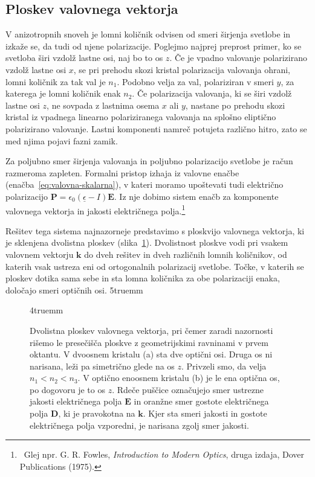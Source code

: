 \subsection*{Ploskev valovnega vektorja}
V anizotropnih snoveh je lomni količnik odvisen od smeri 
širjenja svetlobe in izkaže se, da tudi od njene polarizacije. Poglejmo 
najprej preprost primer, ko se svetloba širi vzdolž lastne osi, naj bo to os $z$.
Če je vpadno valovanje polarizirano vzdolž lastne osi $x$, se pri prehodu
skozi kristal polarizacija valovanja ohrani, lomni količnik za
tak val je $n_{1}$. Podobno velja za val, polariziran v smeri
$y$, za katerega je lomni količnik enak $n_{2}$. Če polarizacija valovanja, 
ki se širi vzdolž lastne osi $z$, ne sovpada z lastnima osema $x$ ali $y$, nastane po 
prehodu skozi kristal iz vpadnega linearno polariziranega valovanja na splošno eliptično polarizirano valovanje. Lastni komponenti namreč potujeta različno
hitro, zato se med njima pojavi fazni zamik. 

Za poljubno smer širjenja valovanja in poljubno polarizacijo svetlobe je račun razmeroma zapleten. 
Formalni pristop izhaja iz valovne enačbe (enačba~\ref{eq:valovna-skalarna}), v kateri
moramo upoštevati tudi električno polarizacijo 
$\mathbf{P} = \epsilon_{0}(\underline{\epsilon}-I)\mathbf{E}$. Iz nje dobimo 
sistem enačb za komponente valovnega vektorja in jakosti električnega polja.\footnote{~Glej 
npr. G. R. Fowles, {\it Introduction to Modern Optics}, druga izdaja, Dover Publications (1975).}

Rešitev tega sistema najnazorneje predstavimo s ploskvijo valovnega vektorja, 
ki je sklenjena dvolistna ploskev (slika~\ref{kploskev}). Dvolistnost ploskve
vodi pri vsakem valovnem vektorju $\mathbf{k}$ do dveh rešitev in dveh različnih lomnih
količnikov, od katerih vsak ustreza eni od ortogonalnih polarizacij svetlobe. Točke, v katerih
se ploskev dotika sama sebe in sta lomna količnika za obe polarizaciji enaka, 
določajo smeri optičnih osi. 
\vglue5truemm
\begin{figure}[ht]
\centering
\def\svgwidth{140truemm} 

\vglue4truemm
\caption{Dvolistna ploskev valovnega vektorja, pri čemer zaradi nazornosti rišemo le presečišča
ploskve z geometrijskimi ravninami v prvem oktantu. 
V dvoosnem kristalu (a) sta dve optični osi. Druga os ni narisana, leži pa 
simetrično glede na os $z$. Privzeli smo, da velja $n_1<n_2<n_3$.
V optično enoosnem kristalu (b) je le ena optična os, 
po dogovoru je to os $z$. Rdeče puščice označujejo smer ustrezne jakosti električnega polja $\mathbf{E}$
in oranžne smer gostote električnega polja $\mathbf{D}$, ki je pravokotna na $\mathbf{k}$. 
Kjer sta smeri jakosti in gostote električnega polja vzporedni, je narisana zgolj smer jakosti.}
\label{kploskev}
\end{figure}


